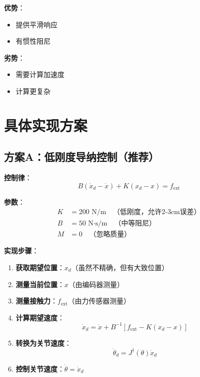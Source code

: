 \documentclass[12pt,a4paper]{article}
\begin{document}
\textbf{优势}：
\begin{itemize}
\item 提供平滑响应
\item 有惯性阻尼
\end{itemize}

\textbf{劣势}：
\begin{itemize}
\item 需要计算加速度
\item 计算更复杂
\end{itemize}

\section{具体实现方案}

\subsection{方案A：低刚度导纳控制（推荐）}

\textbf{控制律}：
\begin{equation}
B(\dot{x}_d - \dot{x}) + K(x_d - x) = f_{\text{ext}}
\end{equation}

\textbf{参数}：
\begin{align}
K &= 200 \text{ N/m} \quad \text{（低刚度，允许2-3cm误差）} \\
B &= 50 \text{ N·s/m} \quad \text{（中等阻尼）} \\
M &= 0 \quad \text{（忽略质量）}
\end{align}

\textbf{实现步骤}：
\begin{enumerate}
\item \textbf{获取期望位置}：$x_d$（虽然不精确，但有大致位置）
\item \textbf{测量当前位置}：$x$（由编码器测量）
\item \textbf{测量接触力}：$f_{\text{ext}}$（由力传感器测量）
\item \textbf{计算期望速度}：
\begin{equation}
\dot{x}_d = \dot{x} + B^{-1}[f_{\text{ext}} - K(x_d - x)]
\end{equation}
\item \textbf{转换为关节速度}：
\begin{equation}
\dot{\theta}_d = J^{\dagger}(\theta)\dot{x}_d
\end{equation}
\item \textbf{控制关节速度}：$\dot{\theta} = \dot{x}_d$
\end{enumerate}
\end{document}
